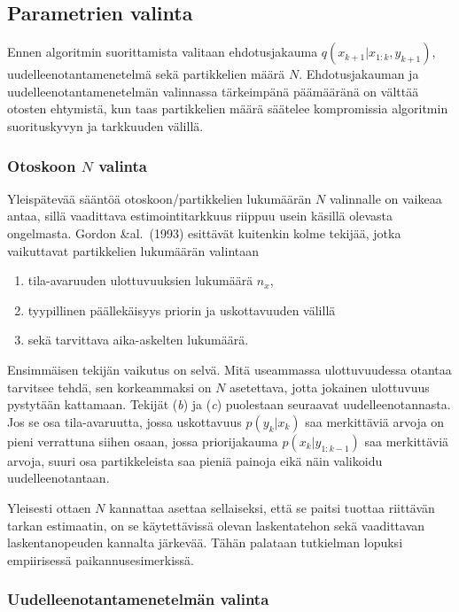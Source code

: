 \documentclass[
  12pt,
  a4paper, twoside]{book}
\providecommand{\tightlist}{%
  \setlength{\itemsep}{0pt}\setlength{\parskip}{0pt}}
\begin{document}
\subsection{Parametrien valinta}

Ennen algoritmin suorittamista valitaan ehdotusjakauma \(q(x_{k+1}|x_{1:k},y_{k+1})\), uudelleenotantamenetelmä sekä partikkelien määrä \(N\). Ehdotusjakauman ja uudelleenotantamenetelmän valinnassa tärkeimpänä päämääränä on välttää otosten ehtymistä, kun taas partikkelien määrä säätelee kompromissia algoritmin suorituskyvyn ja tarkkuuden välillä.

\subsubsection{Otoskoon $N$ valinta}

Yleispätevää sääntöä otoskoon/partikkelien lukumäärän \(N\) valinnalle on vaikeaa antaa, sillä vaadittava estimointitarkkuus riippuu usein käsillä olevasta ongelmasta. Gordon \&al.~(1993) esittävät kuitenkin kolme tekijää, jotka vaikuttavat partikkelien lukumäärän valintaan

\begin{enumerate}
\def\labelenumi{\alph{enumi}.}
\tightlist
\item
  tila-avaruuden ulottuvuuksien lukumäärä \({n_x}\),
\item
  tyypillinen päällekäisyys priorin ja uskottavuuden välillä
\item
  sekä tarvittava aika-askelten lukumäärä.
\end{enumerate}

Ensimmäisen tekijän vaikutus on selvä. Mitä useammassa ulottuvuudessa otantaa tarvitsee tehdä, sen korkeammaksi on \(N\) asetettava, jotta jokainen ulottuvuus pystytään kattamaan. Tekijät (\textit{b}) ja (\textit{c}) puolestaan seuraavat uudelleenotannasta. Jos se osa tila-avaruutta, jossa uskottavuus \(p(y_k|x_k)\) saa merkittäviä arvoja on pieni verrattuna siihen osaan, jossa priorijakauma \(p(x_k|y_{1:k-1})\) saa merkittäviä arvoja, suuri osa partikkeleista saa pieniä painoja eikä näin valikoidu uudelleenotantaan.

Yleisesti ottaen \(N\) kannattaa asettaa sellaiseksi, että se paitsi tuottaa riittävän tarkan estimaatin, on se käytettävissä olevan laskentatehon sekä vaadittavan laskentanopeuden kannalta järkevää. Tähän palataan tutkielman lopuksi empiirisessä paikannusesimerkissä.

\subsubsection{Uudelleenotantamenetelmän valinta}
\end{document}
